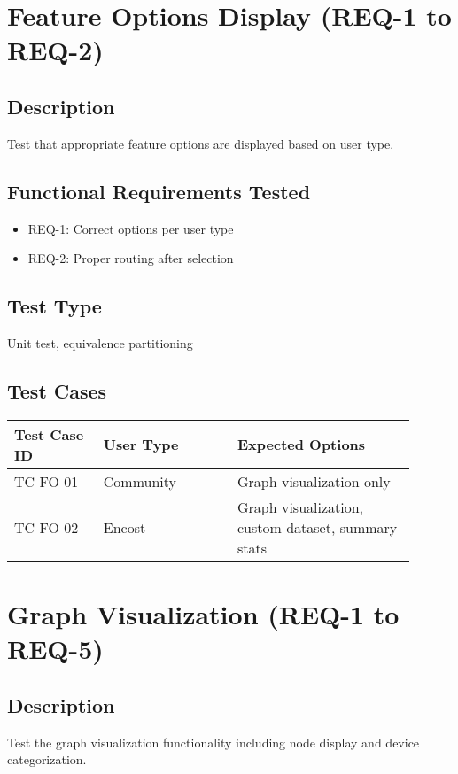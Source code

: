 \documentclass{scrreprt}
\begin{document}
\section{Feature Options Display (REQ-1 to REQ-2)}
\subsection{Description}
Test that appropriate feature options are displayed based on user type.

\subsection{Functional Requirements Tested}
\begin{itemize}
    \item REQ-1: Correct options per user type
    \item REQ-2: Proper routing after selection
\end{itemize}

\subsection{Test Type}
Unit test, equivalence partitioning

\subsection{Test Cases}
\begin{table}[h!]
\centering
\begin{tabular}{|p{0.2\linewidth}|p{0.3\linewidth}|p{0.4\linewidth}|}
    \hline
    Test Case ID & User Type & Expected Options \\
    \hline
    TC-FO-01 & Community & Graph visualization only \\
    \hline
    TC-FO-02 & Encost & Graph visualization, custom dataset, summary stats \\
    \hline
\end{tabular}
\end{table}

\section{Graph Visualization (REQ-1 to REQ-5)}
\subsection{Description}
Test the graph visualization functionality including node display and device categorization.
\end{document}
